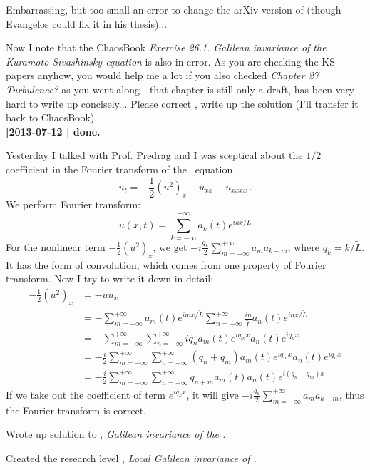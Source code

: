 \begin{description}
Embarrassing, but too small an error to change the arXiv version of 
(though Evangelos could fix it in his thesis)...

Now I note that the ChaosBook {\em Exercise
26.1.
Galilean invariance of the Kuramoto-Sivashinsky equation} is also in error.
As you are checking the KS papers anyhow, you would help me a lot if you also
checked {\em Chapter 27 Turbulence?} as you went along - that chapter is still
only a draft, has been very hard to write up concisely...
Please correct , write up the solution
(I'll transfer it back to ChaosBook).                   \toCB
\\{\bf [2013-07-12 \XD] done.}

\item[2013-07-11 \XD] Yesterday I talked with Prof. Predrag and I was
    sceptical about the $1/2$ coefficient in the Fourier transform
     of the \KS\ equation .
\[
 u_t=-\frac{1}{2}(u^2)_x-u_{xx}-u_{xxxx}
 \,.
\]
We perform Fourier transform:
\[
 u(x,t)=\sum_{k=-\infty}^{+\infty} a_{k}(t)e^{ikx/\tilde{L}}
\]
For the nonlinear term $-\frac{1}{2}(u^2)_x$, we get
$-i\frac{q_k}{2}\sum_{m=-\infty}^{+\infty} a_{m}a_{k-m}$,
where $q_k=k/\tilde{L}$. It has the form of
convolution, which comes from one property of Fourier transform.
Now I try to write it down in detail:
\begin{align*}
 -\frac{1}{2}(u^2)_x &=-uu_x \\
 &=-\sum_{m=-\infty}^{+\infty} a_{m}(t)e^{imx/\tilde{L}}
 \sum_{n=-\infty}^{+\infty} \frac{in}{\tilde{L}} a_{n}(t)e^{inx/\tilde{L}}\\
 &=-\sum_{m=-\infty}^{+\infty}\sum_{n=-\infty}^{+\infty} iq_{n} a_{m}(t)e^{iq_{m}x}a_{n}(t)e^{iq_{n}x}\\
 &=-\frac{i}{2}\sum_{m=-\infty}^{+\infty}\sum_{n=-\infty}^{+\infty}
 (q_{n}+q_m) a_{m}(t)e^{iq_{m}x}a_{n}(t)e^{iq_{n}x}\\
 &=-\frac{i}{2}\sum_{m=-\infty}^{+\infty}\sum_{n=-\infty}^{+\infty} q_{n+m} a_{m}(t)a_{n}(t)e^{i(q_{n}+q_m)x}
\end{align*}
If we take out the coefficient of term $e^{iq_{k}x}$, it will give
$-i\frac{q_k}{2}\sum_{m=-\infty}^{+\infty} a_{m}a_{k-m}$, thus the
Fourier transform  is correct.

\item[2013-07-12 \XD] Wrote up solution to , {\em
    Galilean invariance of the \KSe.}

\item[2013-07-12 Predrag] Created the research level ,
{\em Local Galilean invariance of \KS.}


\end{description}
